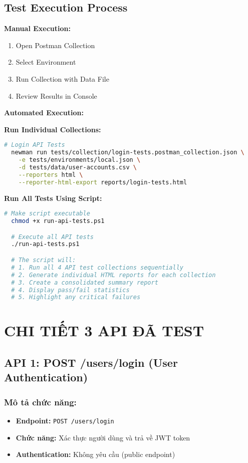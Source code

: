 \documentclass[12pt,a4paper]{article}
\begin{document}
  \subsection{Test Execution Process}

  \textbf{Manual Execution:}
  \begin{enumerate}
  \item Open Postman Collection
  \item Select Environment
  \item Run Collection with Data File
  \item Review Results in Console
  \end{enumerate}

  \textbf{Automated Execution:}

  \textbf{Run Individual Collections:}
  \begin{lstlisting}[language=bash]
  # Login API Tests
  newman run tests/collection/login-tests.postman_collection.json \
    -e tests/environments/local.json \
    -d tests/data/user-accounts.csv \
    --reporters html \
    --reporter-html-export reports/login-tests.html
  \end{lstlisting}

  \textbf{Run All Tests Using Script:}
  \begin{lstlisting}[language=bash]
  # Make script executable
  chmod +x run-api-tests.ps1

  # Execute all API tests
  ./run-api-tests.ps1

  # The script will:
  # 1. Run all 4 API test collections sequentially
  # 2. Generate individual HTML reports for each collection
  # 3. Create a consolidated summary report
  # 4. Display pass/fail statistics
  # 5. Highlight any critical failures
  \end{lstlisting}

  \section{CHI TIẾT 3 API ĐÃ TEST}

  \subsection{API 1: POST /users/login (User Authentication)}

  \subsubsection{Mô tả chức năng:}
  \begin{itemize}
  \item \textbf{Endpoint:} \texttt{POST /users/login}
  \item \textbf{Chức năng:} Xác thực người dùng và trả về JWT token
  \item \textbf{Authentication:} Không yêu cầu (public endpoint)
  \end{itemize}
\end{document}
